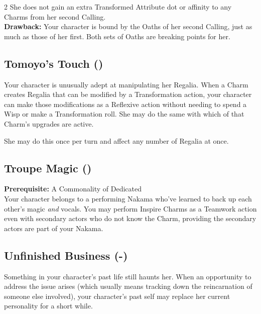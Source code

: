 \begin{multicols}{2}
She does not gain an extra Transformed Attribute dot or affinity to any Charms from her second Calling.\\

\noindent \textbf{Drawback:} Your character is bound by the Oaths of her second Calling, just as much as those of her first. Both sets of Oaths are breaking points for her.

\subsection*{Tomoyo's Touch (\textbullet)}

Your character is unusually adept at manipulating her Regalia. When a Charm creates Regalia that can be modified by a Transformation action, your character can make those modifications as a Reflexive action without needing to spend a Wisp or make a Transformation roll. She may do the same with which of that Charm's upgrades are active. 

She may do this once per turn and affect any number of Regalia at once. 

\subsection*{Troupe Magic (\textbullet)}

\textbf{Prerequisite:} A Commonality of Dedicated \\

\noindent Your character belongs to a performing Nakama who've learned to back up each other’s magic \textit{and} vocals. You may perform Inspire Charms as a Teamwork action even with secondary actors who do not know the Charm, providing the secondary actors are part of your Nakama. 

\subsection*{Unfinished Business (\textbullet\nobreak\hspace{.16667em}-\nobreak\hspace{.16667em}\textbullet\textbullet\textbullet)}

Something in your character's past life still haunts her. When an opportunity to address the issue arises (which usually means tracking down the reincarnation of someone else involved), your character's past self may replace her current personality for a short while. 


\end{multicols}

